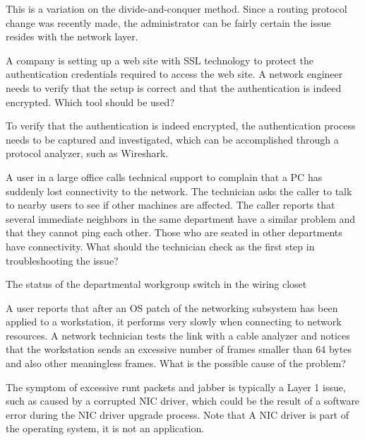 \begin{solution}
This is a variation on the divide-and-conquer method. Since a routing protocol change was recently made, the administrator can be fairly certain the issue resides with the network layer.
\end{solution}

\begin{example}
A company is setting up a web site with SSL technology to protect the authentication credentials required to access the web site. A network engineer needs to verify that the setup is correct and that the authentication is indeed encrypted. Which tool should be used?
\end{example}

\begin{solution}
To verify that the authentication is indeed encrypted, the authentication process needs to be captured and investigated, which can be accomplished through a protocol analyzer, such as Wireshark. 
\end{solution}

\begin{example}
A user in a large office calls technical support to complain that a PC has suddenly lost connectivity to the network. The technician asks the caller to talk to nearby users to see if other machines are affected. The caller reports that several immediate neighbors in the same department have a similar problem and that they cannot ping each other. Those who are seated in other departments have connectivity. What should the technician check as the first step in troubleshooting the issue?
\end{example}

\begin{solution}
The status of the departmental workgroup switch in the wiring closet
\end{solution}

\begin{example}
A user reports that after an OS patch of the networking subsystem has been applied to a workstation, it performs very slowly when connecting to network resources. A network technician tests the link with a cable analyzer and notices that the workstation sends an excessive number of frames smaller than 64 bytes and also other meaningless frames. What is the possible cause of the problem?
\end{example}

\begin{solution}
The symptom of excessive runt packets and jabber is typically a Layer 1 issue, such as caused by a corrupted NIC driver, which could be the result of a software error during the NIC driver upgrade process. Note that  A NIC driver is part of the operating system, it is not an application.
\end{solution}

